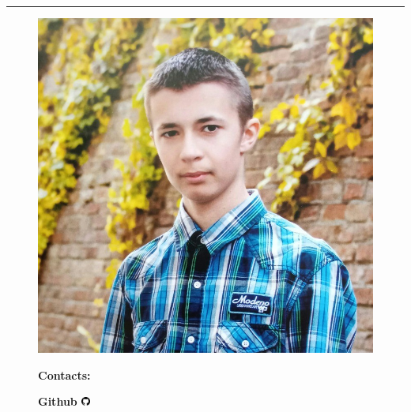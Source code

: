 
\par\noindent\rule{\textwidth}{0.1mm}

\begin{figure}
    \begin{flushright}
        \includegraphics[width=0.2\linewidth]{images/profile.jpeg}

        {
            \vspace{0.5cm}
            \textbf{\large{Contacts:}}
            
            \vspace{0.2cm}\textbf{Github \includegraphics[width=0.30cm]{images/github.png}}
        }
    \end{flushright}
\end{figure}
